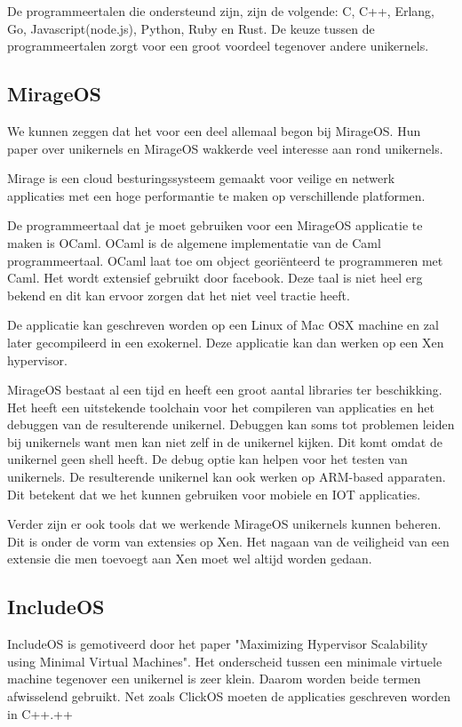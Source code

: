 \documentclass[pdftex,a4paper,12pt,twoside]{report}
\begin{document}
De programmeertalen die ondersteund zijn, zijn de volgende: C, C++, Erlang, Go, Javascript(node.js), Python, Ruby en Rust. De keuze tussen de programmeertalen zorgt voor een groot voordeel tegenover andere unikernels.

\subsection{MirageOS}

We kunnen zeggen dat het voor een deel allemaal begon bij MirageOS. Hun paper over unikernels en MirageOS wakkerde veel interesse aan rond unikernels. 

Mirage is een cloud besturingssysteem gemaakt voor veilige en netwerk applicaties met een hoge performantie te maken op verschillende platformen.

De programmeertaal dat je moet gebruiken voor een MirageOS applicatie te maken is OCaml. OCaml is de algemene implementatie van de Caml programmeertaal. OCaml laat toe om object georiënteerd te programmeren met Caml.  Het wordt extensief gebruikt door facebook. Deze taal is niet heel erg bekend en dit kan ervoor zorgen dat het niet veel tractie heeft.

De applicatie kan geschreven worden op een Linux of Mac OSX machine en zal later gecompileerd in een exokernel. Deze applicatie kan dan werken op een Xen hypervisor.

MirageOS bestaat al een tijd en heeft een groot aantal libraries ter beschikking. Het heeft een uitstekende toolchain voor het compileren van applicaties en het debuggen van de resulterende unikernel. Debuggen kan soms tot problemen leiden bij unikernels want men kan niet zelf in de unikernel kijken. Dit komt omdat de unikernel geen shell heeft. De debug optie kan helpen voor het testen van unikernels. De resulterende unikernel kan ook werken op ARM-based apparaten. Dit betekent dat we het kunnen gebruiken voor mobiele en IOT applicaties.

Verder zijn er ook tools dat we werkende MirageOS unikernels kunnen beheren. Dit is onder de vorm van extensies op Xen. Het nagaan van de veiligheid van een extensie die men toevoegt aan Xen moet wel altijd worden gedaan.

\subsection{IncludeOS}

IncludeOS is gemotiveerd door het paper "Maximizing Hypervisor Scalability using Minimal Virtual Machines". Het onderscheid tussen een minimale virtuele machine tegenover een unikernel is zeer klein. Daarom worden beide termen afwisselend gebruikt. Net zoals ClickOS moeten de applicaties geschreven worden in C++.++
\end{document}
